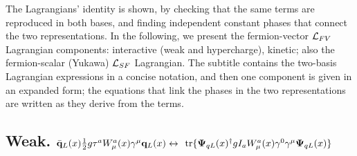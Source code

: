 \documentclass[12pt]{article}
\renewcommand\[{\begin{dmath}}
\renewcommand\]{\end{dmath}}
\newcommand{\boldmathPsi}{\mbox{\boldmath$\Psi$\unboldmath}}
\begin{document}
 The  Lagrangians' identity is shown, by checking that the same terms are reproduced in both bases, and finding independent  constant phases that connect the two representations.
In the following, we present   the  fermion-vector  ${\cal L}_{FV}$ Lagrangian components:    interactive (weak and hypercharge),   kinetic; also the fermion-scalar  (Yukawa)   ${\cal L}_{SF}$    Lagrangian. The subtitle contains the two-basis Lagrangian expressions in  a concise notation, and then   one component is given in an expanded form;     the equations that link the phases in  the two representations are written as they derive from the terms.

\subsection {Weak. $\bar {  \bf q }_L(x)   \frac{1}{2}g\tau^a  W_\mu^a(x)  \gamma^\mu  { \bf q}_L (x)
\leftrightarrow$ $ {\rm tr } \{  {  \boldmathPsi_{qL}  }(x)  ^\dagger    g I_a  W_\mu^a(x)  \gamma^0 \gamma^\mu \boldmathPsi_{qL} (x) \}  $ }
\end{document}
